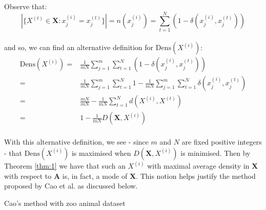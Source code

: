 \noindent Observe that:
\[
	|\{X^{(t)} \in \textbf{X} : x_j^{(i)} = x_j^{(t)}\}| = n(x_j^{(i)}) = 
	\sum_{t=1}^N (1 - \delta(x_j^{(i)}, x_j^{(t)}))
\]\\

and so, we can find an alternative definition for \(\text{Dens}(X^{(i)})\):
\begin{equation}
\begin{aligned}
    \text{Dens}(X^{(i)}) = {} & {} \frac{1}{mN} \sum_{j=1}^m \sum_{t=1}^N 
                         (1 - \delta(x_j^{(i)}, x_j^{(t)}))
    \\
			             = {} & {} \frac{1}{mN} \sum_{j=1}^m \sum_{t=1}^N 1 - 
                         \frac{1}{mN} \sum_{j=1}^m \sum_{t=1}^N 
                         \delta(x_j^{(i)}, x_j^{(t)})
    \\
                         = {} & {} \frac{mN}{mN} - \frac{1}{mN} \sum_{t=1}^N 
                         d(X^{(i)}, X^{(t)})
    \\
			             = {} & {} 1 - \frac{1}{mN} D(\textbf{X}, X^{(i)})
\end{aligned}
\end{equation}\\

With this alternative definition, we see - since \(m\) and \(N\) are fixed 
positive integers - that \(\text{Dens}(X^{(i)})\) is maximised when 
\(D(\textbf{X}, X^{(i)})\) is minimised. Then by Theorem \ref{thm:1} we have
that such an \(X^{(i)}\) with maximal average density in \textbf{X} with respect
to \textbf{A} is, in fact, a mode of \textbf{X}. This notion helps justify the 
method proposed by Cao et al. as discussed below.\\



\begin{example}\label{ex:cao}
    Cao's method with zoo animal dataset
\end{example}

